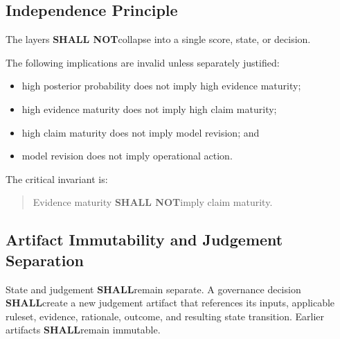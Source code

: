 \documentclass[11pt,a4paper]{article}
\newcommand{\shall}{\textbf{SHALL}}
\newcommand{\shallnot}{\textbf{SHALL NOT}}
\begin{document}
\begin{center}
\end{center}

\subsection{Independence Principle}

The layers \shallnot collapse into a single score, state, or decision.

The following implications are invalid unless separately justified:

\begin{itemize}[leftmargin=*]
  \item high posterior probability does not imply high evidence maturity;
  \item high evidence maturity does not imply high claim maturity;
  \item high claim maturity does not imply model revision; and
  \item model revision does not imply operational action.
\end{itemize}

The critical invariant is:

\begin{quote}
Evidence maturity \shallnot imply claim maturity.
\end{quote}

\subsection{Artifact Immutability and Judgement Separation}

State and judgement \shall remain separate. A governance decision \shall create a new judgement artifact that references its inputs, applicable ruleset, evidence, rationale, outcome, and resulting state transition. Earlier artifacts \shall remain immutable.
\end{document}
